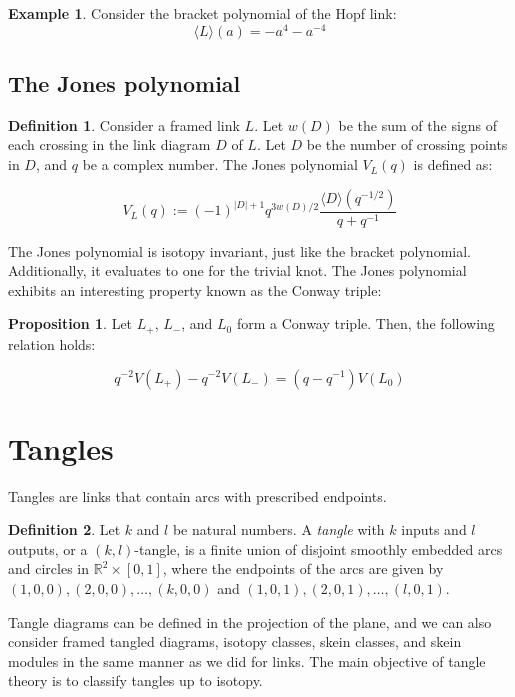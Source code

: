\documentclass[11pt]{article}
\theoremstyle{definition}
\newtheorem{Prop}{Proposition}[section]
\newtheorem{ex}{Example}[section]
\newtheorem{Def}{Definition}[section]
\begin{document}
\begin{ex}

Consider the bracket polynomial of the Hopf link:
\[ \langle L\rangle (a) = -a^4 - a^{-4} \]
\end{ex}
\subsection{\Large \textbf{The Jones polynomial}}
\begin{Def}
    
Consider a framed link \(L\). Let \(w(D)\) be the sum of the signs of each crossing in the link diagram \(D\) of \(L\). Let \(D\) be the number of crossing points in \(D\), and \(q\) be a complex number. The Jones polynomial \(V_{L}(q)\) is defined as:

\[V_{L}(q) := (-1)^{|D|+1} q^{3w(D)/2} \frac{\langle D\rangle(q^{-1/2})}{q+q^{-1}}\]

\end{Def}
The Jones polynomial is isotopy invariant, just like the bracket polynomial. Additionally, it evaluates to one for the trivial knot. The Jones polynomial exhibits an interesting property known as the Conway triple:

\begin{Prop} 
Let \(L_+\), \(L_{-}\), and \(L_0\) form a Conway triple. Then, the following relation holds:

\[q^{-2}V(L_{+})-q^{-2}V(L_{-}) = (q-q^{-1})V(L_0)\]
\end{Prop}


\section{\Large \textbf{Tangles}} Tangles are links that contain arcs with prescribed endpoints.

\begin{Def}
Let \(k\) and \(l\) be natural numbers. A \textit{tangle} with \(k\) inputs and \(l\) outputs, or a \((k,l)\)-tangle, is a finite union of disjoint smoothly embedded arcs and circles in \(\mathbb{R}^2 \times [0,1]\), where the endpoints of the arcs are given by \((1,0,0), (2,0,0), \ldots, (k,0,0)\) and \((1,0,1), (2,0,1), \ldots, (l,0,1)\).
\end{Def}

Tangle diagrams can be defined in the projection of the plane, and we can also consider framed tangled diagrams, isotopy classes, skein classes, and skein modules in the same manner as we did for links. The main objective of tangle theory is to classify tangles up to isotopy.
\end{document}
